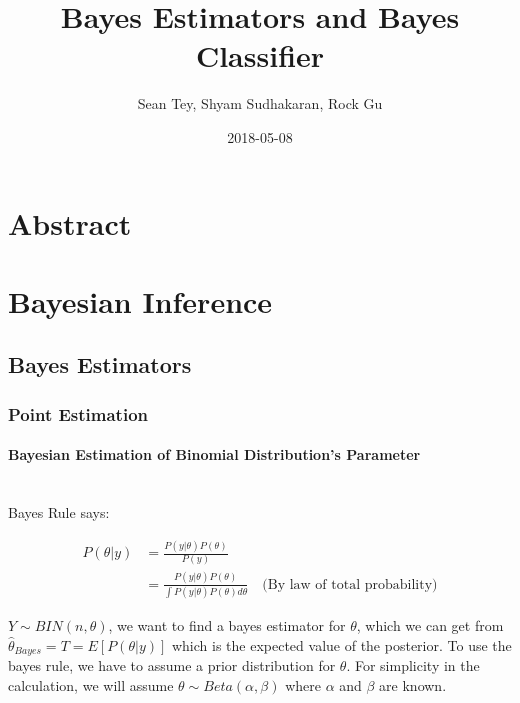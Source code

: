 \documentclass{article}
\title{Bayes Estimators and Bayes Classifier}
\date{2018-05-08}
\author{Sean Tey, Shyam Sudhakaran, Rock Gu}
\begin{document}

\maketitle
\newpage

\doublespacing
\tableofcontents
\singlespacing

\newpage


\section{Abstract}

\newpage

\section{Bayesian Inference}

\newpage

\subsection{Bayes Estimators}

\subsubsection{Point Estimation}

\paragraph{Bayesian Estimation of Binomial Distribution's Parameter}\mbox{}\\

Bayes Rule says:

\begin{align*} 
P(\theta|y) &= \frac{P(y|\theta)P(\theta)}{P(y)} \\
&= \frac{P(y|\theta)P(\theta)}{\int P(y|\theta)P(\theta) d\theta} \quad \text{(By law of total probability)}
\end{align*}

$Y \sim BIN(n,\theta)$, we want to find a bayes estimator for $\theta$, which we can get from\\ $\hat{\theta}_{Bayes} = T = E[P(\theta|y)]$ which is the expected value of the posterior. To use the bayes rule, we have to assume a prior distribution for $\theta$. For simplicity in the calculation, we will assume $\theta \sim Beta(\alpha,\beta)$ where $\alpha$ and $\beta$ are known.\newline
\end{document}

